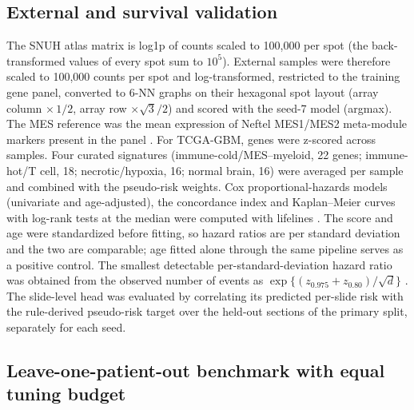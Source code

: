 \documentclass[11pt,letterpaper]{article}
\begin{document}
\subsection{External and survival validation}

The SNUH atlas matrix is log1p of counts scaled to 100{,}000 per spot (the back-transformed values of every spot sum to $10^5$). External samples were therefore scaled to 100{,}000 counts per spot and log-transformed, restricted to the training gene panel, converted to 6-NN graphs on their hexagonal spot layout (array column $\times\,1/2$, array row $\times \sqrt{3}/2$) and scored with the seed-7 model (argmax). The MES reference was the mean expression of Neftel MES1/MES2 meta-module markers present in the panel \cite{neftel2019}. For TCGA-GBM, genes were z-scored across samples. Four curated signatures (immune-cold/MES--myeloid, 22 genes; immune-hot/T cell, 18; necrotic/hypoxia, 16; normal brain, 16) were averaged per sample and combined with the pseudo-risk weights. Cox proportional-hazards models (univariate and age-adjusted), the concordance index and Kaplan--Meier curves with log-rank tests at the median were computed with lifelines \cite{davidsonpilon2019}. The score and age were standardized before fitting, so hazard ratios are per standard deviation and the two are comparable; age fitted alone through the same pipeline serves as a positive control. The smallest detectable per-standard-deviation hazard ratio was obtained from the observed number of events as $\exp\{(z_{0.975} + z_{0.80})/\sqrt{d}\}$ \cite{schoenfeld1983}. The slide-level head was evaluated by correlating its predicted per-slide risk with the rule-derived pseudo-risk target over the held-out sections of the primary split, separately for each seed.

\subsection{Leave-one-patient-out benchmark with equal tuning budget}
\end{document}
